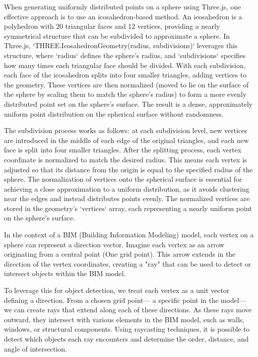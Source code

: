 When generating uniformly distributed points on a sphere using Three.js, one effective approach is to use an icosahedron-based method.
 An icosahedron is a polyhedron with 20 triangular faces and 12 vertices, providing a nearly symmetrical structure that can be subdivided to
  approximate a sphere. In Three.js, `THREE.IcosahedronGeometry(radius, subdivisions)` leverages this structure, where `radius` defines 
  the sphere's radius, and `subdivisions` specifies how many times each triangular face should be divided. With each subdivision, 
  each face of the icosahedron splits into four smaller triangles, adding vertices to the geometry. These vertices are then normalized 
  (moved to lie on the surface of the sphere by scaling them to match the sphere's radius) to form a more evenly distributed point set 
  on the sphere’s surface. The result is a dense, approximately uniform point distribution on the spherical surface without randomness.

The subdivision process works as follows: at each subdivision level, new vertices are introduced in the middle of each edge 
of the original triangles, and each new face is split into four smaller triangles. After the splitting process, each vertex coordinate 
is normalized to match the desired radius. This means each vertex is adjusted so that its distance from the origin is equal to the specified 
radius of the sphere. The normalization of vertices onto the spherical surface is essential for achieving a close approximation to a 
uniform distribution, as it avoids clustering near the edges and instead distributes points evenly. 
The normalized vertices are stored in the geometry’s `vertices` array, each representing a nearly uniform point on the sphere’s surface.


In the context of a BIM (Building Information Modeling) model, each vertex on a sphere 
 can represent a direction vector. Imagine each vertex as an arrow originating from a central point (One grid point).
This arrow extends in the direction of the vertex coordinates, creating a "ray" that can be used to detect or intersect objects 
within the BIM model.

To leverage this for object detection, we treat each vertex as a unit vector defining a direction. 
From a chosen grid point— a specific point in the model— we can create rays that extend along each 
of these directions. As these rays move outward, they intersect with various elements in the BIM model, 
such as walls, windows, or structural components. Using raycasting techniques, it is possible to detect
 which objects each ray encounters and determine the order, distance, and angle of intersection.